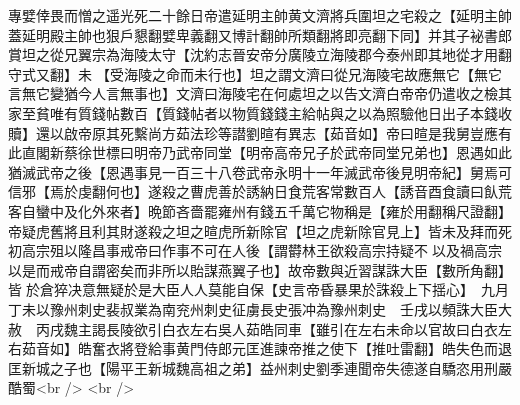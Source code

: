 專嬖倖畏而憎之遥光死二十餘日帝遣延明主帥黄文濟將兵圍坦之宅殺之【延明主帥蓋延明殿主帥也狠戶懇翻嬖卑義翻又博計翻帥所類翻將即亮翻下同】并其子袐書郎賞坦之從兄翼宗為海陵太守【沈約志晉安帝分廣陵立海陵郡今泰州即其地從才用翻守式又翻】未【受海陵之命而未行也】坦之謂文濟曰從兄海陵宅故應無它【無它言無它變猶今人言無事也】文濟曰海陵宅在何處坦之以告文濟白帝帝仍遣收之檢其家至貧唯有質錢帖數百【質錢帖者以物質錢錢主給帖與之以為照驗他日出子本錢收贖】還以啟帝原其死繫尚方茹法珍等譛劉暄有異志【茹音如】帝曰暄是我舅豈應有此直閣新蔡徐世標曰明帝乃武帝同堂【明帝高帝兄子於武帝同堂兄弟也】恩遇如此猶滅武帝之後【恩遇事見一百三十八卷武帝永明十一年滅武帝後見明帝紀】舅焉可信邪【焉於虔翻何也】遂殺之曹虎善於誘納日食荒客常數百人【誘音酉食讀曰飤荒客自蠻中及化外來者】晩節吝嗇罷雍州有錢五千萬它物稱是【雍於用翻稱尺證翻】帝疑虎舊將且利其財遂殺之坦之暄虎所新除官【坦之虎新除官見上】皆未及拜而死初高宗殂以隆昌事戒帝曰作事不可在人後【謂欎林王欲殺高宗持疑不以及禍高宗以是而戒帝自謂密矣而非所以貽謀燕翼子也】故帝數與近習謀誅大臣【數所角翻】皆於倉猝决意無疑於是大臣人人莫能自保【史言帝昏暴果於誅殺上下揺心】　九月丁未以豫州刺史裴叔業為南兖州刺史征虜長史張冲為豫州刺史　壬戌以頻誅大臣大赦　丙戌魏主謁長陵欲引白衣左右吳人茹皓同車【雖引在左右未命以官故曰白衣左右茹音如】皓奮衣將登給事黄門侍郎元匡進諫帝推之使下【推吐雷翻】皓失色而退匡新城之子也【陽平王新城魏高祖之弟】益州刺史劉季連聞帝失德遂自驕恣用刑嚴酷蜀<br />
<br />
